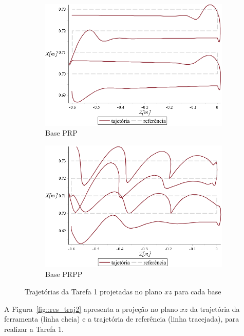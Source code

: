 \begin{figure}[h]
\begin{subfigure}[b]{0.48\textwidth}
        \includegraphics[width=\textwidth]{figs/t1_traj_base_prp}
        \caption{Base PRP}
        \label{fig::t1_traj_base_prp}
    \end{subfigure}
    \quad %
    \begin{subfigure}[b]{0.48\textwidth}
        \includegraphics[width=\textwidth]{figs/t1_traj_base_prpp}
        \caption{Base PRPP}
        \label{fig::t1_traj_base_prpp}
    \end{subfigure}
    \caption{Trajetórias da Tarefa 1 projetadas no plano $xz$ para cada base}
    \label{fig::res_traj1}
\end{figure}

A Figura~\ref{fig::res_traj2} apresenta a projeção no plano $xz$ da trajetória
da ferramenta (linha cheia) e a trajetória de referência (linha tracejada), para
realizar a Tarefa 1.

